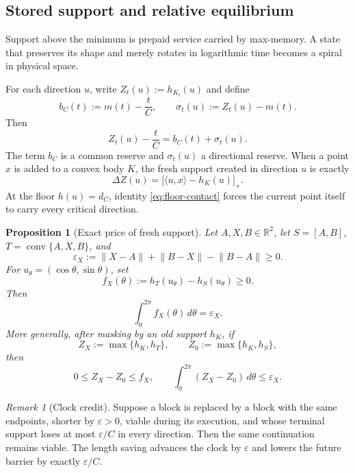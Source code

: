 \documentclass[10pt,a4paper]{article}
\newtheorem{proposition}[proposition]{Proposition}
\theoremstyle{definition}
\theoremstyle{remark}
\newtheorem{remark}[remark]{Remark}
\DeclareMathOperator{\conv}{conv}
\newcommand{\R}{\mathbb{R}}
\newcommand{\norm}[1]{\lVert #1\rVert}
\newcommand{\ip}[2]{\langle #1,#2\rangle}
\newcommand{\eps}{\varepsilon}
\begin{document}
\subsection{Stored support and relative equilibrium}
\label{sec:relative-equilibria}
Support above the minimum is prepaid service carried by max-memory. A state that preserves its shape and merely rotates in logarithmic time becomes a spiral in physical space.

For each direction $u$, write $Z_t(u):=h_{K_t}(u)$ and define
\begin{equation}
b_C(t):=m(t)-\frac{t}{C},
\qquad
\sigma_t(u):=Z_t(u)-m(t).
\label{eq:stored-support}
\end{equation}
Then
\begin{equation}
Z_t(u)-\frac{t}{C}=b_C(t)+\sigma_t(u).
\label{eq:reserve-decomposition}
\end{equation}
The term $b_C$ is a common reserve and $\sigma_t(u)$ a directional reserve. When a point $x$ is added to a convex body $K$, the fresh support created in direction $u$ is exactly
\begin{equation}
\Delta Z(u)=\bigl[\ip{u}{x}-h_K(u)\bigr]_+.
\label{eq:fresh-support}
\end{equation}
At the floor $h(u)=d_C$, identity \eqref{eq:floor-contact} forces the current point itself to carry every critical direction.

\begin{proposition}[Exact price of fresh support]
\label{prop:fresh-support-price}
Let $A,X,B\in\R^2$, let $S=[A,B]$, $T=\conv\{A,X,B\}$, and
\[
\eps_X:=\norm{X-A}+\norm{B-X}-\norm{B-A}\ge0.
\]
For $u_\theta=(\cos\theta,\sin\theta)$, set
\[
f_X(\theta):=h_T(u_\theta)-h_S(u_\theta)\ge0.
\]
Then
\begin{equation}
\int_0^{2\pi}f_X(\theta)\,d\theta=\eps_X.
\label{eq:fresh-price}
\end{equation}
More generally, after masking by an old support $h_K$, if
\[
Z_X:=\max\{h_K,h_T\},
\qquad
Z_0:=\max\{h_K,h_S\},
\]
then
\begin{equation}
0\le Z_X-Z_0\le f_X,
\qquad
\int_0^{2\pi}(Z_X-Z_0)\,d\theta\le\eps_X.
\label{eq:masked-price}
\end{equation}
\end{proposition}

\begin{remark}[Clock credit]
\label{rem:clock-credit}
Suppose a block is replaced by a block with the same endpoints, shorter by $\eps>0$, viable during its execution, and whose terminal support loses at most $\eps/C$ in every direction. Then the same continuation remains viable. The length saving advances the clock by $\eps$ and lowers the future barrier by exactly $\eps/C$.
\end{remark}
\end{document}
